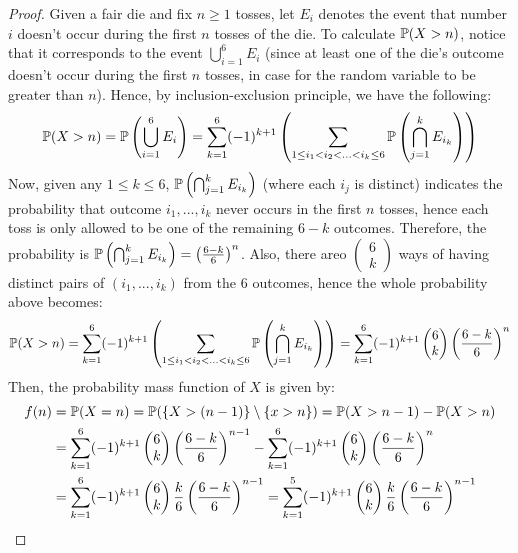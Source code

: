 \documentclass{article}
\begin{document}
\begin{proof}
    Given a fair die and fix $n\geq 1$ tosses, let $E_i$ denotes the event that number $i$ doesn't occur during the first $n$ tosses of the die. To calculate $\mathbb{P}(X>n)$, notice that it corresponds to the event $\bigcup_{i=1}^6 E_i$ (since at least one of the die's outcome doesn't occur during the first $n$ tosses, in case for the random variable to be greater than $n$). Hence, by inclusion-exclusion principle, we have the following:
    \begin{align}
        \mathbb{P}(X>n) = \mathbb{P}\left(\bigcup_{i=1}^{6}E_i\right) = \sum_{k=1}^{6}(-1)^{k+1}\left(\sum_{1\leq i_1 < i_2 < ... < i_k \leq 6}\mathbb{P}\left(\bigcap_{j=1}^{k}E_{i_k}\right)\right)
    \end{align}
    Now, given any $1\leq k\leq 6$, $\mathbb{P}\left(\bigcap_{j=1}^{k}E_{i_k}\right)$ (where each $i_j$ is distinct) indicates the probability that outcome $i_1,...,i_k$ never occurs in the first $n$ tosses, hence each toss is only allowed to be one of the remaining $6-k$ outcomes. Therefore, the probability is $\mathbb{P}\left(\bigcap_{j=1}^{k}E_{i_k}\right) = \left(\frac{6-k}{6}\right)^n$. Also, there areo $\begin{pmatrix}6\\k\end{pmatrix}$ ways of having distinct pairs of $(i_1,...,i_k)$ from the $6$ outcomes, hence the whole probability above becomes:
    \begin{align}
        \mathbb{P}(X>n) = \sum_{k=1}^{6}(-1)^{k+1}\left(\sum_{1\leq i_1 < i_2 < ... < i_k \leq 6}\mathbb{P}\left(\bigcap_{j=1}^{k}E_{i_k}\right)\right) = \sum_{k=1}^{6}(-1)^{k+1}\begin{pmatrix}6\\k\end{pmatrix}\left(\frac{6-k}{6}\right)^n
    \end{align}
    Then, the probability mass function of $X$ is given by:
    \begin{align}
        f(n) &= \mathbb{P}(X=n) = \mathbb{P}(\{X>(n-1)\}\setminus \{x>n\}) = \mathbb{P}(X>n-1)-\mathbb{P}(X>n) \\
        &= \sum_{k=1}^{6}(-1)^{k+1}\begin{pmatrix}6\\k\end{pmatrix}\left(\frac{6-k}{6}\right)^{n-1}-\sum_{k=1}^{6}(-1)^{k+1}\begin{pmatrix}6\\k\end{pmatrix}\left(\frac{6-k}{6}\right)^n\\
        &= \sum_{k=1}^{6}(-1)^{k+1}\begin{pmatrix}6\\k\end{pmatrix}\frac{k}{6}\left(\frac{6-k}{6}\right)^{n-1} = \sum_{k=1}^{5}(-1)^{k+1}\begin{pmatrix}6\\k\end{pmatrix}\frac{k}{6}\left(\frac{6-k}{6}\right)^{n-1}
    \end{align}
\end{proof}
\end{document}
